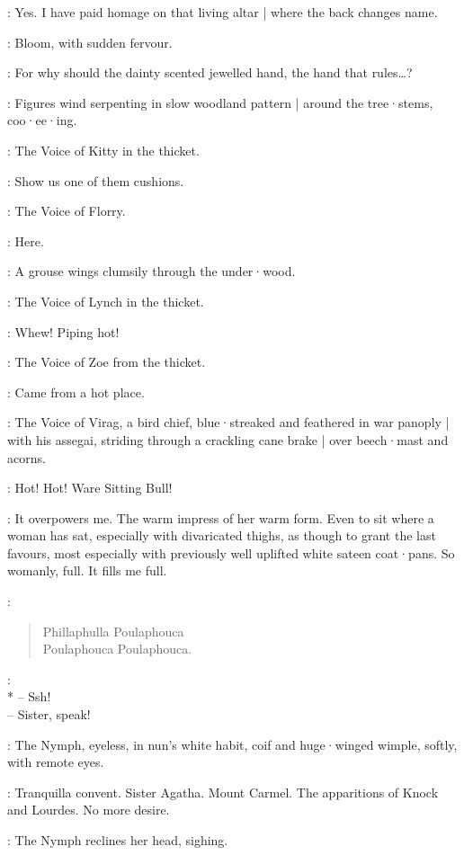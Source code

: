 \Bloom:
Yes.
I have paid homage on that living altar |
where the back changes name.

:
Bloom,
with sudden fervour.

\Bloom:
For why should the dainty scented jewelled hand,
the hand that rules…?

:
Figures wind serpenting in slow woodland pattern |
around the tree·stems,
coo·ee·ing.

:
The Voice of Kitty in the thicket.

\Kitty:
Show us one of them cushions.

:
The Voice of Florry.

\Florry:
Here.

:
A grouse wings clumsily through the under·wood.

:
The Voice of Lynch in the thicket.

\Lynch:
Whew!
Piping hot!

:
The Voice of Zoe from the thicket.

\Zoe:
Came from a hot place.

:
The Voice of Virag,
%
a bird chief,
blue·streaked and feathered in war panoply |
with his assegai,
striding through a crackling cane brake |
over beech·mast and acorns.

\Virag:
Hot!
Hot!
Ware Sitting Bull!

\Bloom:
It overpowers me.
The warm impress of her warm form.
Even to sit where a woman has sat,
especially with divaricated thighs,
as though to grant the last favours,
most especially with previously well uplifted white sateen coat·pans.
So womanly,
full.
It fills me full.

\Waterfall[3b]:
\begin{verse}
    Phillaphulla Poulaphouca\\
%
    Poulaphouca Poulaphouca.
\end{verse}

\Yews[3b]:\\*
-- Ssh!\\
-- Sister, speak!

:
The Nymph,
eyeless,
in nun's white habit,
coif and huge·winged wimple,
softly,
with remote eyes.

\Nymph:
Tranquilla convent.
Sister Agatha.
Mount Carmel.
The apparitions of Knock and Lourdes.
No more desire.

:
The Nymph reclines her head,
sighing.

